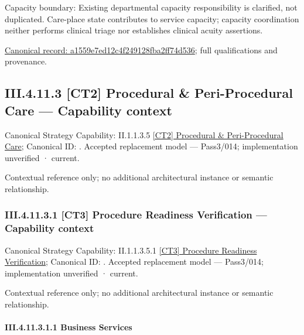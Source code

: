Capacity boundary: Existing departmental capacity responsibility is clarified, not duplicated. Care-place state contributes to service capacity; capacity coordination neither performs clinical triage nor establishes clinical acuity assertions.


{\footnotesize \href{../../../../continuum/business/business-function/a1559e7ed12c4f249128fba2ff74d536.md}{Canonical record: a1559e7ed12c4f249128fba2ff74d536}; full qualifications and provenance.}\par
\subsection*{III.4.11.3 [CT2] Procedural \& Peri-Procedural Care — Capability context}
\label{navigation:III.4.11.3}

{\small Canonical Strategy Capability: II.1.1.3.5 \hyperref[element:2f1e08ecaf7e4d589582c26d7e8966f1]{[CT2] Procedural \& Peri-Procedural Care}; Canonical ID: \texttt{}. Accepted replacement model — Pass3/014; implementation unverified · current.}\par
Contextual reference only; no additional architectural instance or semantic relationship.\par
\subsubsection*{III.4.11.3.1 [CT3] Procedure Readiness Verification — Capability context}
\label{navigation:III.4.11.3.1}

{\small Canonical Strategy Capability: II.1.1.3.5.1 \hyperref[element:1ba44ca495b74b6fb3a607c39c6672e6]{[CT3] Procedure Readiness Verification}; Canonical ID: \texttt{}. Accepted replacement model — Pass3/014; implementation unverified · current.}\par
Contextual reference only; no additional architectural instance or semantic relationship.\par
\paragraph*{III.4.11.3.1.1 Business Services}
\label{navigation:III.4.11.3.1.1}

